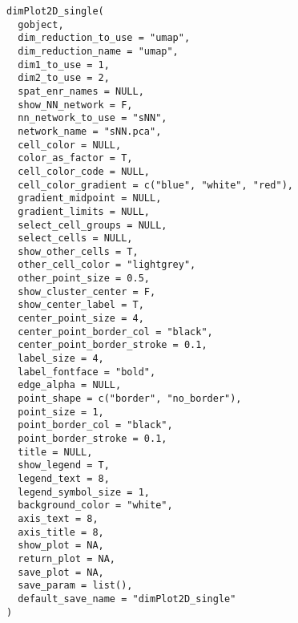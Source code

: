 \documentclass[a4paper]{book}
\begin{document}
%
\begin{Usage}
\begin{verbatim}
dimPlot2D_single(
  gobject,
  dim_reduction_to_use = "umap",
  dim_reduction_name = "umap",
  dim1_to_use = 1,
  dim2_to_use = 2,
  spat_enr_names = NULL,
  show_NN_network = F,
  nn_network_to_use = "sNN",
  network_name = "sNN.pca",
  cell_color = NULL,
  color_as_factor = T,
  cell_color_code = NULL,
  cell_color_gradient = c("blue", "white", "red"),
  gradient_midpoint = NULL,
  gradient_limits = NULL,
  select_cell_groups = NULL,
  select_cells = NULL,
  show_other_cells = T,
  other_cell_color = "lightgrey",
  other_point_size = 0.5,
  show_cluster_center = F,
  show_center_label = T,
  center_point_size = 4,
  center_point_border_col = "black",
  center_point_border_stroke = 0.1,
  label_size = 4,
  label_fontface = "bold",
  edge_alpha = NULL,
  point_shape = c("border", "no_border"),
  point_size = 1,
  point_border_col = "black",
  point_border_stroke = 0.1,
  title = NULL,
  show_legend = T,
  legend_text = 8,
  legend_symbol_size = 1,
  background_color = "white",
  axis_text = 8,
  axis_title = 8,
  show_plot = NA,
  return_plot = NA,
  save_plot = NA,
  save_param = list(),
  default_save_name = "dimPlot2D_single"
)
\end{verbatim}
\end{Usage}
%
\end{document}
